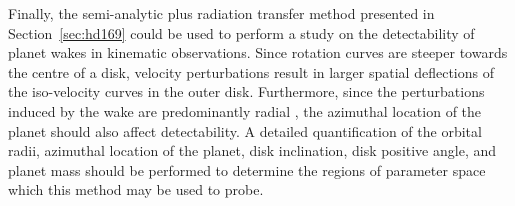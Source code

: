 Finally, the semi-analytic plus radiation transfer method presented in Section~\ref{sec:hd169} could be used to perform a study on the detectability of planet wakes in kinematic observations.
Since rotation curves are steeper towards the centre of a disk, velocity perturbations result in larger spatial deflections of the iso-velocity curves in the outer disk.
Furthermore, since the perturbations induced by the wake are predominantly radial \citep{rafikov2002a,calcino2022}, the azimuthal location of the planet should also affect detectability.
A detailed quantification of the orbital radii, azimuthal location of the planet, disk inclination, disk positive angle, and planet mass should be performed to determine the regions of parameter space which this method may be used to probe.